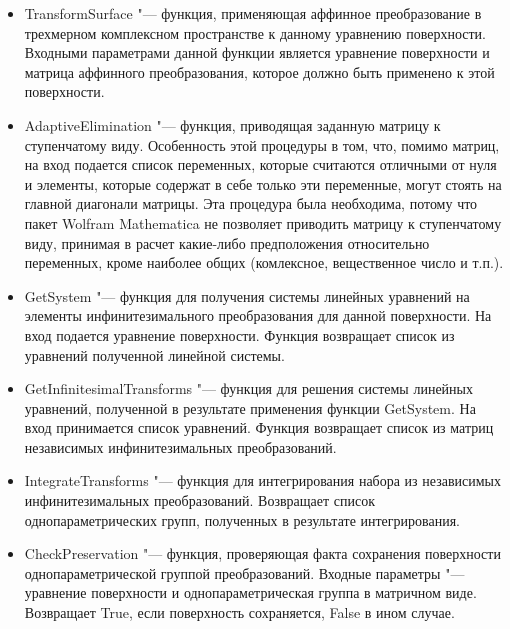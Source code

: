\documentclass[../main.tex]{subfiles}
\begin{document}
\begin{itemize}

\item {\ttfamily TransformSurface} "--- функция, применяющая аффинное преобразование в трехмерном комплексном пространстве к данному уравнению поверхности. Входными параметрами данной функции является уравнение поверхности и матрица аффинного преобразования, которое должно быть применено к этой поверхности.

\item {\ttfamily AdaptiveElimination} "--- функция, приводящая заданную матрицу к ступенчатому виду. Особенность этой процедуры в том, что, помимо матриц, на вход подается список переменных, которые считаются отличными от нуля и элементы, которые содержат в себе только эти переменные, могут стоять на главной диагонали матрицы. Эта процедура была необходима, потому что пакет {\ttfamily Wolfram Mathematica} не позволяет приводить матрицу к ступенчатому виду, принимая в расчет какие-либо предположения относительно переменных, кроме наиболее общих (комлексное, вещественное число и т.п.).

\item {\ttfamily GetSystem} "---  функция для получения системы линейных уравнений на элементы инфинитезимального преобразования для данной поверхности. На вход подается уравнение поверхности. Функция возвращает список из уравнений полученной линейной системы.

\item {\ttfamily GetInfinitesimalTransforms} "--- функция для решения системы линейных уравнений, полученной в результате применения функции {\ttfamily GetSystem}. На вход принимается список уравнений. Функция возвращает список из матриц независимых инфинитезимальных преобразований.

\item {\ttfamily IntegrateTransforms} "--- функция для интегрирования набора из независимых инфинитезимальных преобразований. Возвращает список однопараметрических групп, полученных в результате интегрирования. 

\item {\ttfamily CheckPreservation} "--- функция, проверяющая факта сохранения поверхности однопараметрической группой преобразований. Входные параметры "--- уравнение поверхности и однопараметрическая группа в матричном виде. Возвращает {\ttfamily True}, если поверхность сохраняется, {\ttfamily False} в ином случае.

\end{itemize}
\end{document}
